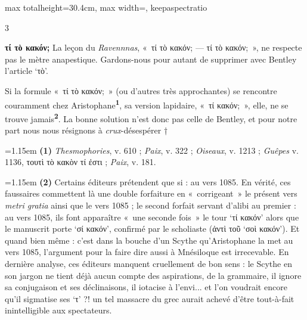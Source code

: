 \documentclass[11pt,twoside]{book}
\newcommand{\italique}[1]{\textit{#1}}
\newcommand{\latin}[1]{\textit{#1}}
\newcommand{\marqueur}[1]{\textsuperscript{\color{rubricRed}\textbf{#1}}}
\begin{document}
\begin{adjustbox}{max totalheight=30.4cm, max width=\textwidth, keepaspectratio}
\begin{minipage}{\textwidth}
{\begin{multicols}{3}
\par\vspace{1.5pt}
 \textbf{τί τὸ κακόν;} La leçon du \italique{Ravennnas}, «~τί τὸ κακόν; --- τί τὸ κακόν;~», ne respecte pas le mètre anapestique. Gardons-nous pour autant de supprimer avec Bentley l'article `τὸ'.
\par\vspace{1.5pt}
\noindent Si la formule «~τί τὸ κακόν;~» (ou d'autres très approchantes) se rencontre couramment chez Aristophane\marqueur{1}, sa version lapidaire, «~τί κακόν;~», elle, ne se trouve jamais\marqueur{2}. La bonne solution n'est donc pas celle de Bentley, et pour notre part nous nous résignons à \latin{crux}-désespérer †
\par\vspace{1.5pt}
\par\vspace{1.2pt}\par\nopagebreak\vspace{1pt}\noindent\hangindent=1.15em {\color{sepiaNote}\textbf{(1)}} \italique{Thesmophories}, v. 610 ; \italique{Paix}, v. 322 ; \italique{Oiseaux}, v. 1213 ; \italique{Guêpes} v. 1136, τουτὶ τὸ κακὸν τί ἐστι ; \italique{Paix}, v. 181.
\par\vspace{1.5pt}
\noindent\hangindent=1.15em {\color{sepiaNote}\textbf{(2)}} Certains éditeurs prétendent que si : au vers 1085. En vérité, ces faussaires commettent là une double forfaiture en «~corrigeant~» le présent vers \italique{metri gratia} ainsi que le vers 1085 ; le second forfait servant d'alibi au premier : au vers 1085, ils font apparaître «~une seconde fois~» le tour `τί κακόν' alors que le manuscrit porte `σί κακόν', confirmé par le scholiaste (ἀντὶ τοῦ `σοὶ κακόν'). Et quand bien même : c'est dans la bouche d'un Scythe qu'Aristophane la met au vers 1085, l'argument pour la faire dire aussi à Mnésiloque est irrecevable. En dernière analyse, ces éditeurs manquent cruellement de bon sens : le Scythe en son jargon ne tient déjà aucun compte des aspirations, de la grammaire, il ignore sa conjugaison et ses déclinaisons, il iotacise à l'envi... et l'on voudrait encore qu'il sigmatise ses `τ' ?! un tel massacre du grec aurait achevé d'être tout-à-fait inintelligible aux spectateurs.
\par\vspace{1.5pt}

\end{multicols}}
\end{minipage}
\end{adjustbox}
\end{document}
